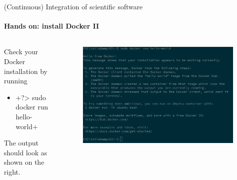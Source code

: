 \begin{frame}{(Continuous) Integration of scientific software}
    \framesubtitle{Hands on: install Docker II}
    \begin{columns}
    \begin{column}{0.5\textwidth}
        \vfill
    Check your Docker installation by running
    \begin{itemize}
        \item {}+?> sudo docker run hello-world+
    \end{itemize}
    The output should look as shown on the right.
    \end{column}

    \begin{column}{0.5\textwidth}
    \begin{figure}
        \includegraphics[width=\textwidth]{figures/docker-installation-success.png}
    \end{figure}
    \end{column}
    \end{columns}
\end{frame}
